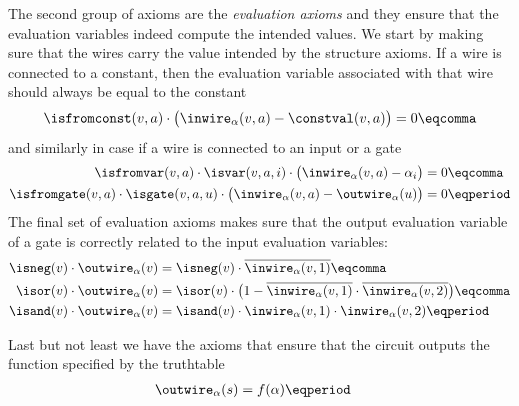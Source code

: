 The second group of axioms are the \emph{evaluation axioms} and they
ensure that the evaluation variables indeed compute the intended
values. We start by making sure that the wires carry the value
intended by the structure axioms. If a wire is connected to a
constant, then the evaluation variable associated with that wire
should always be equal to the constant
\begin{align}
  \label{eq:inwire-const}
  \isfromconst(v,a) \cdot
  \big( \inwire_{\alpha}(v,a) - \constval(v, a) \big) = 0 \eqcomma
\end{align}
and similarly in case if a wire is connected to an input or a gate
\begin{align}
  \label{eq:inwire-var}
  \isfromvar(v, a) \cdot \isvar(v, a, i) \cdot
  \big( \inwire_\alpha(v, a) - \alpha_i\big) &= 0
  \eqcomma\\
  \label{eq:inwire-gate}
  \isfromgate(v, a) \cdot \isgate(v, a, u) \cdot
  \big(\inwire_\alpha(v, a) - \outwire_\alpha(u)\big) &= 0 \eqperiod
\end{align}
The final set of evaluation axioms makes sure that the output
evaluation variable of a gate is correctly related to the input
evaluation variables:
\begin{align}
  \label{eq:ax-neg}
  \isneg(v) \cdot
  \outwire_{\alpha}(v)
  &=
    \isneg(v) \cdot
    \overline{\inwire_{\alpha}(v, 1)}\eqcomma\\
  \label{eq:ax-or}
  \isor(v) \cdot
  \outwire_{\alpha}(v)
  &=
    \isor(v)
    \cdot \big(
    1 -
    \overline{\inwire_{\alpha}(v, 1)} \cdot
    \overline{\inwire_{\alpha}(v, 2)}
    \big) \eqcomma\\
  \label{eq:ax-and}
  \isand(v) \cdot
  \outwire_{\alpha}(v)
  &=
    \isand(v) \cdot
    \inwire_{\alpha}(v, 1) \cdot
    \inwire_{\alpha}(v, 2) \eqperiod
\end{align}

Last but not least we have the axioms that ensure that the circuit
outputs the function specified by the truthtable
\begin{align}
  \label{eq:ax-correct}
  \outwire_{\alpha}(s) &= f(\alpha) \eqperiod
\end{align}
